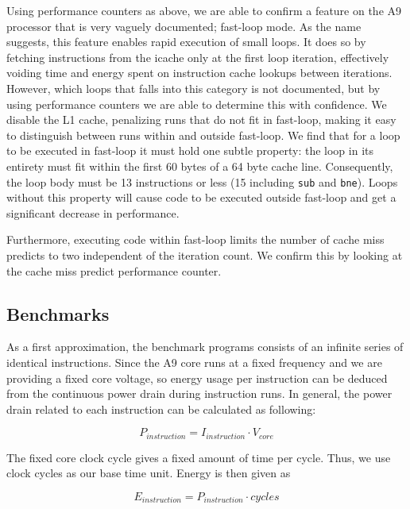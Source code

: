 Using performance counters as above, we are able to confirm a feature on the A9
processor that is very vaguely documented; fast-loop\texttrademark{} mode. As
the name suggests, this feature enables rapid execution of small loops. It does
so by fetching instructions from the icache only at the first loop iteration,
effectively voiding time and energy spent on instruction cache lookups between
iterations. However, which loops that falls into this category is not
documented, but by using performance counters we are able to determine this with
confidence. We disable the L1 cache, penalizing runs that do not fit in
fast-loop, making it easy to distinguish between runs within and outside
fast-loop. We find that for a loop to be executed in fast-loop it must hold one
subtle property: the loop in its entirety must fit within the first 60 bytes of
a 64 byte cache line. Consequently, the loop body must be 13 instructions or
less (15 including \texttt{sub} and \texttt{bne}). Loops without this property
will cause code to be executed outside fast-loop and get a significant decrease
in performance.

Furthermore, executing code within fast-loop limits the number of cache
miss predicts to two independent of the iteration count. We confirm this by
looking at the cache miss predict performance counter.

\subsection{Benchmarks}
As a first approximation, the benchmark programs consists of an infinite series
of identical instructions. Since the A9 core runs at a fixed frequency and we are
providing a fixed core voltage, so energy usage per instruction can
be deduced from the continuous power drain during instruction runs. In general,
the power drain related to each instruction can be calculated as following:

\begin{equation}
    P_{instruction} = I_{instruction} \cdot V_{core}
    \label{eq:1}
\end{equation}

The fixed core clock cycle gives a fixed amount of time per cycle. Thus, we
use clock cycles as our base time unit. Energy is then given as

\begin{equation}
    E_{instruction} = P_{instruction} \cdot cycles
    \label{eq:2}
\end{equation}

